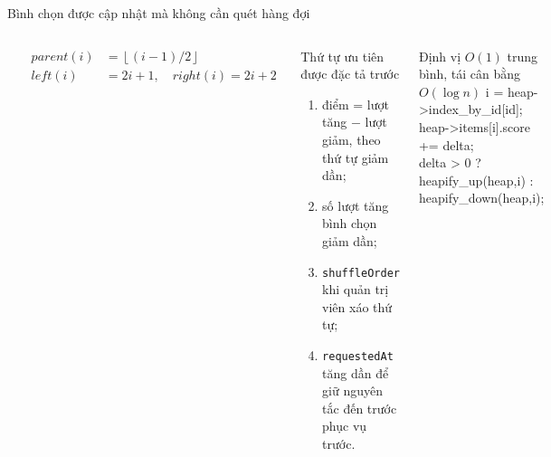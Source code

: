 \documentclass[aspectratio=169,11pt]{beamer}
\newcommand{\code}[1]{\texttt{#1}}
\begin{document}
\begin{frame}{Bình chọn được cập nhật mà không cần quét hàng đợi}
\small
\begin{columns}[T,totalwidth=\textwidth]
\begin{center}
\end{center}
\[
\begin{aligned}
parent(i)&=\left\lfloor(i-1)/2\right\rfloor\\
left(i)&=2i+1,\quad right(i)=2i+2
\end{aligned}
\]
\footnotesize
\begin{block}{Thứ tự ưu tiên được đặc tả trước}
\begin{enumerate}
  \item điểm = lượt tăng $-$ lượt giảm, theo thứ tự giảm dần;
  \item số lượt tăng bình chọn giảm dần;
  \item \code{shuffleOrder} khi quản trị viên xáo thứ tự;
  \item \code{requestedAt} tăng dần để giữ nguyên tắc đến trước phục vụ trước.
\end{enumerate}
\end{block}
\begin{block}{Định vị $O(1)$ trung bình, tái cân bằng $O(\log n)$}
{\ttfamily\scriptsize
i = heap->index\_by\_id[id];\\
heap->items[i].score += delta;\\
delta > 0 ? heapify\_up(heap,i) : heapify\_down(heap,i);}
\end{block}
\smallskip
\end{columns}
\end{frame}
\end{document}
